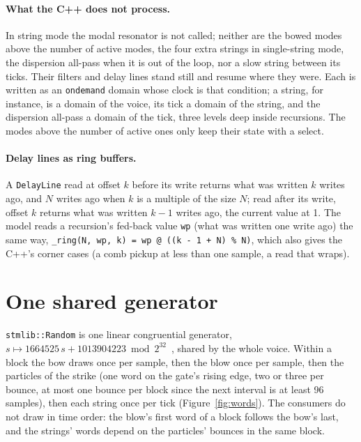\documentclass[10pt,a4paper,twocolumn]{article}
\newcommand{\code}[1]{\texttt{#1}}
\begin{document}
\paragraph{What the C++ does not process.} In string mode the modal resonator is not called; neither are the bowed modes above the number of active modes, the four extra strings in single-string mode, the dispersion all-pass when it is out of the loop, nor a slow string between its ticks. Their filters and delay lines stand still and resume where they were. Each is written as an \code{ondemand} domain whose clock is that condition; a string, for instance, is a domain of the voice, its tick a domain of the string, and the dispersion all-pass a domain of the tick, three levels deep inside recursions. The modes above the number of active ones only keep their state with a select.

\paragraph{Delay lines as ring buffers.} A \code{DelayLine} read at offset $k$ before its write returns what was written $k$ writes ago, and $N$ writes ago when $k$ is a multiple of the size $N$; read after its write, offset $k$ returns what was written $k-1$ writes ago, the current value at 1. The model reads a recursion's fed-back value \code{wp} (what was written one write ago) the same way, \code{\_ring(N, wp, k) = wp @ ((k - 1 + N) \% N)}, which also gives the C++'s corner cases (a comb pickup at less than one sample, a read that wraps).

\section{One shared generator}
\label{sec:random}

\code{stmlib::Random} is one linear congruential generator, $s \mapsto 1664525\,s + 1013904223 \bmod 2^{32}$~\cite{press1992}, shared by the whole voice. Within a block the bow draws once per sample, then the blow once per sample, then the particles of the strike (one word on the gate's rising edge, two or three per bounce, at most one bounce per block since the next interval is at least 96 samples), then each string once per tick (Figure~\ref{fig:words}). The consumers do not draw in time order: the blow's first word of a block follows the bow's last, and the strings' words depend on the particles' bounces in the same block.
\end{document}
